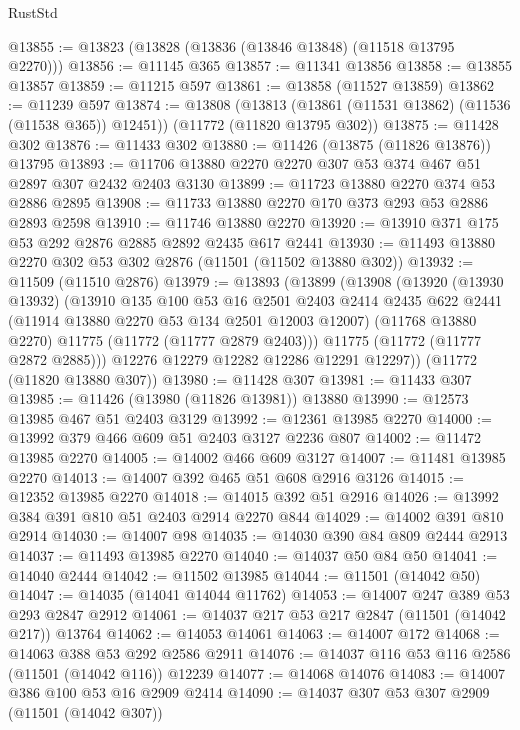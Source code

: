 \begin{lexlean}{RustStd}
\begin{coremodule}
@13855 := @13823 (@13828 (@13836 (@13846 @13848) (@11518 @13795 @2270)))
@13856 := @11145 @365
@13857 := @11341 @13856
@13858 := @13855 @13857
@13859 := @11215 @597
@13861 := @13858 (@11527 @13859)
@13862 := @11239 @597
@13874 := @13808
    (@13813 (@13861 (@11531 @13862) (@11536 (@11538 @365)) @12451))
    (@11772 (@11820 @13795 @302))
@13875 := @11428 @302
@13876 := @11433 @302
@13880 := @11426 (@13875 (@11826 @13876)) @13795
@13893 := @11706 @13880 @2270 @2270 @307 @53 @374 @467 @51 @2897 @307 @2432 @2403 @3130
@13899 := @11723 @13880 @2270 @374 @53 @2886 @2895
@13908 := @11733 @13880 @2270 @170 @373 @293 @53 @2886 @2893 @2598
@13910 := @11746 @13880 @2270
@13920 := @13910 @371 @175 @53 @292 @2876 @2885 @2892 @2435 @617 @2441
@13930 := @11493 @13880 @2270 @302 @53 @302 @2876 (@11501 (@11502 @13880 @302))
@13932 := @11509 (@11510 @2876)
@13979 := @13893
    (@13899
      (@13908
        (@13920
          (@13930 @13932)
          (@13910
            @135
            @100
            @53
            @16
            @2501
            @2403
            @2414
            @2435
            @622
            @2441
            (@11914 @13880 @2270 @53 @134 @2501 @12003 @12007)
            (@11768 @13880 @2270)
            @11775
            (@11772 (@11777 @2879 @2403)))
          @11775
          (@11772 (@11777 @2872 @2885)))
        @12276
        @12279
        @12282
        @12286
        @12291
        @12297))
    (@11772 (@11820 @13880 @307))
@13980 := @11428 @307
@13981 := @11433 @307
@13985 := @11426 (@13980 (@11826 @13981)) @13880
@13990 := @12573 @13985 @467 @51 @2403 @3129
@13992 := @12361 @13985 @2270
@14000 := @13992 @379 @466 @609 @51 @2403 @3127 @2236 @807
@14002 := @11472 @13985 @2270
@14005 := @14002 @466 @609 @3127
@14007 := @11481 @13985 @2270
@14013 := @14007 @392 @465 @51 @608 @2916 @3126
@14015 := @12352 @13985 @2270
@14018 := @14015 @392 @51 @2916
@14026 := @13992 @384 @391 @810 @51 @2403 @2914 @2270 @844
@14029 := @14002 @391 @810 @2914
@14030 := @14007 @98
@14035 := @14030 @390 @84 @809 @2444 @2913
@14037 := @11493 @13985 @2270
@14040 := @14037 @50 @84 @50
@14041 := @14040 @2444
@14042 := @11502 @13985
@14044 := @11501 (@14042 @50)
@14047 := @14035 (@14041 @14044 @11762)
@14053 := @14007 @247 @389 @53 @293 @2847 @2912
@14061 := @14037 @217 @53 @217 @2847 (@11501 (@14042 @217)) @13764
@14062 := @14053 @14061
@14063 := @14007 @172
@14068 := @14063 @388 @53 @292 @2586 @2911
@14076 := @14037 @116 @53 @116 @2586 (@11501 (@14042 @116)) @12239
@14077 := @14068 @14076
@14083 := @14007 @386 @100 @53 @16 @2909 @2414
@14090 := @14037 @307 @53 @307 @2909 (@11501 (@14042 @307))

\end{coremodule}
\end{lexlean}
